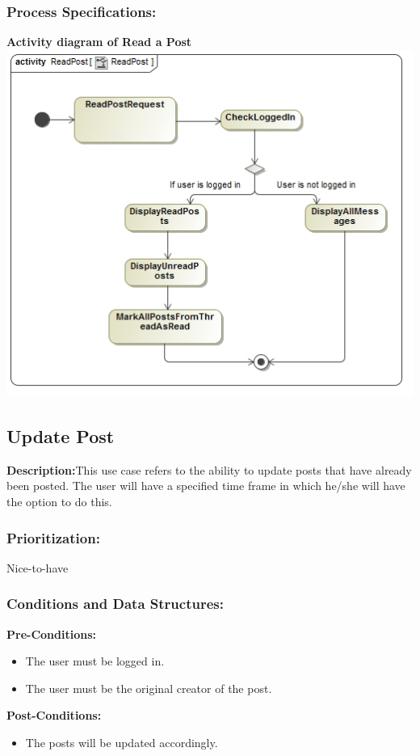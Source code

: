 \documentclass[a4paper,11pt]{article}
\begin{document}
\subsubsection{Process Specifications:} 
\textbf{Activity diagram of Read a Post}\\ 
\includegraphics[width=1\linewidth]{./Images/PostHandling/postReadAct.jpg}\\

\subsection{Update Post}
\textbf{Description:}This use case refers to the ability to update posts that have already been posted. The user will have a specified time frame in which he/she will have the option to do this.  
\subsubsection{Prioritization:} Nice-to-have
\subsubsection{Conditions and Data Structures:}
\textbf{Pre-Conditions:}
\begin{itemize}
	\item The user must be logged in.
	\item The user must be the original creator of the post.
\end{itemize}
\textbf{Post-Conditions:}
\begin{itemize}
	\item The posts will be updated accordingly.
\end{itemize}
\end{document}
